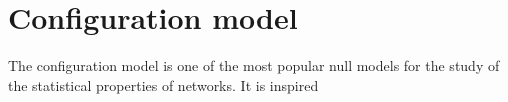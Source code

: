





\section{Configuration model} %
\label{sec:configuration_model}

The configuration model is one of the most popular null models for the study of the statistical properties of networks.
It is inspired 



